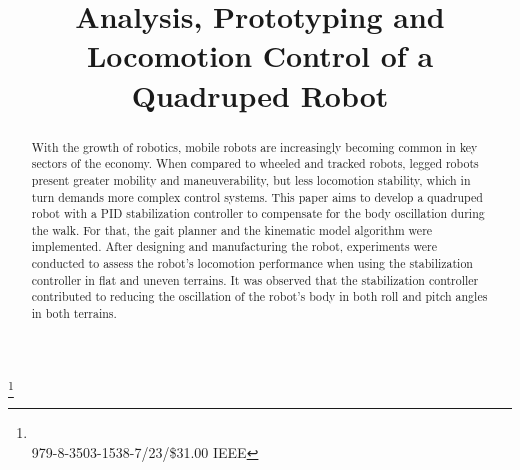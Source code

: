 \documentclass[conference]{IEEEtran}
\begin{document}
\title{Analysis, Prototyping and Locomotion Control of a Quadruped Robot\\
}

\author{
  \and
  \and
}

\maketitle

\let\thefootnote\relax\footnote{\\979-8-3503-1538-7/23/\$31.00
IEEE}

\begin{abstract}
  With the growth of robotics, mobile robots are increasingly becoming common in key sectors of the economy. When compared to wheeled and tracked robots, legged robots present greater mobility and maneuverability, but less locomotion stability, which in turn demands more complex control systems. This paper aims to develop a quadruped robot with a PID  stabilization controller to compensate for the body oscillation during the walk. For that, the gait planner and the kinematic model algorithm were implemented. After designing and manufacturing the robot, experiments were conducted to assess the robot's locomotion performance when using the stabilization controller in flat and uneven terrains. It was observed that the stabilization controller contributed to reducing the oscillation of the robot's body in both roll and pitch angles in both terrains.
\end{abstract}
\end{document}
